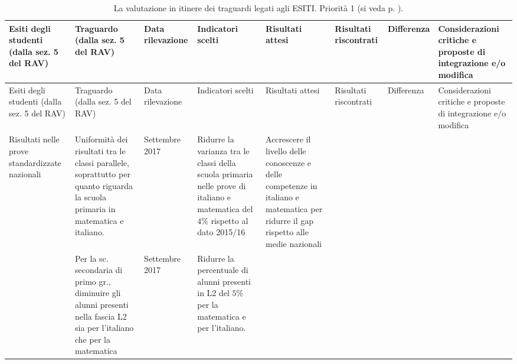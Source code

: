 \documentclass[12pt,a4paper,oneside]{memoir}
\begin{document}
\begin{footnotesize}
\begin{longtable}{|>{\raggedright}p{1.248cm}|>{\raggedright}p{1.248cm}|>{\raggedright}p{1.248cm}|>{\raggedright}p{1.248cm}|>{\raggedright}p{1.248cm}|>{\raggedright}p{1.248cm}|>{\raggedright}p{1.248cm}|>{\raggedright\arraybackslash}p{1.248cm}|}
\caption{La valutazione in itinere dei traguardi legati agli ESITI. Priorità 1 (si veda p. \pageref{priorità}).}  \label{valutazione-in-itinere1}\\
\hline
\rowcolor{violetto}
Esiti degli studenti (dalla sez. 5 del RAV)&Tra\-guar\-do (dalla sez. 5 del RAV)&Data ri\-le\-va\-zio\-ne&In\-di\-ca\-to\-ri scel\-ti&Ri\-sul\-ta\-ti at\-te\-si&Ri\-sul\-ta\-ti ris\-con\-tra\-ti&Dif\-fe\-ren\-za&Con\-si\-de\-ra\-zio\-ni cri\-ti\-che e pro\-po\-ste di in\-te\-gra\-zio\-ne e/o mo\-di\-fi\-ca\\\hline
\endfirsthead
\hline
\rowcolor{violetto}
Esiti degli studenti (dalla sez. 5 del RAV)&Tra\-guar\-do (dalla sez. 5 del RAV)&Data ri\-le\-va\-zio\-ne&In\-di\-ca\-to\-ri scel\-ti&Ri\-sul\-ta\-ti at\-te\-si&Ri\-sul\-ta\-ti ris\-con\-tra\-ti&Dif\-fe\-ren\-za&Con\-si\-de\-ra\-zio\-ni cri\-ti\-che e pro\-po\-ste di in\-te\-gra\-zio\-ne e/o mo\-di\-fi\-ca\\\hline
\endhead
\hline \multicolumn{8}{r}{\emph{\normalsize{Continua nella pagina successiva}}}
\endfoot
\hline
\endlastfoot
Ri\-sul\-ta\-ti nelle prove standardizzate nazionali&U\-ni\-for\-mi\-tà dei risultati tra le classi parallele, soprattutto per quanto riguarda la scuola primaria in matematica e italiano.&Set\-tem\-bre 2017&Ridurre la varianza tra le classi della scuola primaria nelle prove di italiano e matematica del $4\%$ rispetto al dato 2015/16&Ac\-cre\-sce\-re il livello delle conoscenze e delle competenze in italiano e matematica per ridurre il gap rispetto alle medie nazionali&&&\\\hline
&Per la sc. secondaria di primo gr., diminuire gli alunni presenti nella fascia L2 sia per l'italiano che per la matematica&Set\-tem\-bre 2017&Ridurre la percentuale di alunni presenti in L2  del $5\%$ per la matematica e per l'italiano.&&&&\\\hline
\end{longtable}
\end{footnotesize}
\end{document}
